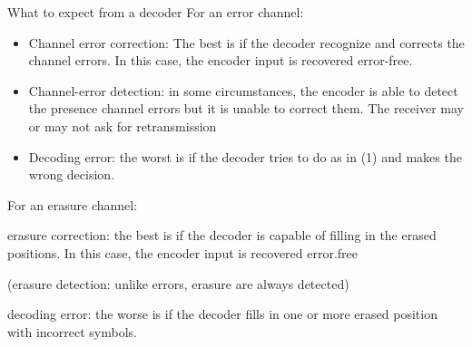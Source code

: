 \begin{parag}{What to expect from a decoder}
    For an error channel:
    \begin{itemize}
        \item Channel error correction: The best is if the decoder recognize and corrects the channel errors. In this case, the encoder input is recovered error-free.
        \item Channel-error detection: in some circumstances, the encoder is able to detect the presence channel errors but it is unable to correct them. The receiver may or may not ask for retransmission
        \item Decoding error: the worst is if the decoder tries to do as in (1) and makes the wrong decision.
    \end{itemize}
   For an erasure channel:
   \begin{izemize}
      \item erasure correction: the best is if the decoder is capable of filling in the erased positions. In this case, the encoder input is recovered error.free
      \item (erasure detection: unlike errors, erasure are always detected)
      \item decoding error: the worse is if the decoder fills in one or more erased position with incorrect symbols.
   \end{izemize}
   
\end{parag}
